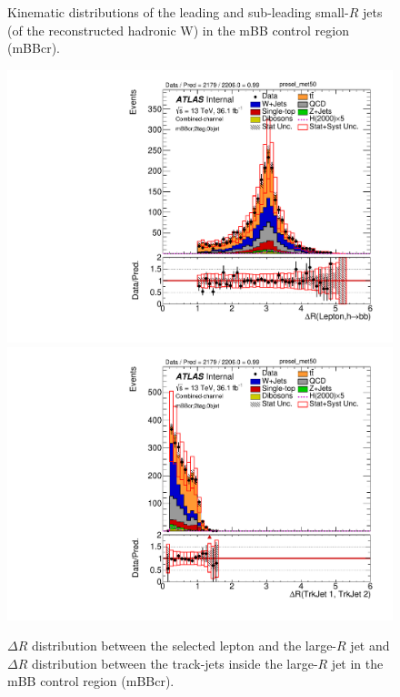 \begin{figure}[!ht]
\begin{center}
\caption{Kinematic distributions of the leading and sub-leading small-$R$ jets (of the reconstructed hadronic W)
in the mBB control region (mBBcr).}
\label{fig:boosted_mbbcr_whad_jets}
\end{center}
\end{figure}
 
\begin{figure}[!h]
\begin{center}
\includegraphics[scale=0.33]{./figures/boosted/PlotsInMbbCR/DataMC_2tag_0bjet_mbbcr_lepton_presel_met50_drHbbLep}
\includegraphics[scale=0.33]{./figures/boosted/PlotsInMbbCR/DataMC_2tag_0bjet_mbbcr_lepton_presel_met50_drbtrkjet1btrkjet2}\\
\caption{$\Delta R$ distribution between the selected lepton and the large-$R$ jet and $\Delta R$ distribution between the track-jets inside
the large-$R$ jet in the mBB control region (mBBcr).}
\label{fig:boosted_mbbcr_dr}
\end{center}
\end{figure}
 
